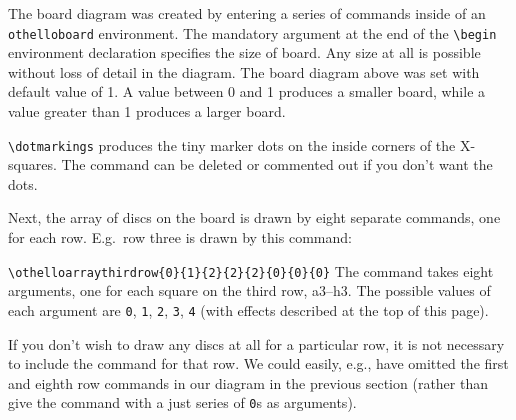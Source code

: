 \documentclass[a4paper,12pt]{article}
\begin{document}
The board diagram was created by entering a series of commands inside of an \verb=othelloboard= environment. The mandatory argument at the end of the \verb=\begin= environment declaration specifies the size of board. Any size at all is possible without loss of detail in the diagram. The board diagram above was set with default value of 1. A value between 0 and 1 produces a smaller board, while a value greater than 1 produces a larger board.

\begin{description}
\item{\verb=\dotmarkings=} produces the tiny marker dots on the inside corners of the X-squares. The command can be deleted or commented out if you don't want the dots.
\end{description}

Next, the array of discs on the board is drawn by eight separate commands, one for each row. E.g.\ row three is drawn by this command:
\begin{description}
\item{\verb=\othelloarraythirdrow{0}{1}{2}{2}{2}{0}{0}{0}=} The command takes eight arguments, one for each square on the third row, a3--h3. The possible values of each argument are \verb=0=, \verb=1=, \verb=2=, \verb=3=, \verb=4= (with effects described at the top of this page). 
\end{description}

If you don't wish to draw any discs at all for a particular row, it is not necessary to include the command for that row. We could easily, e.g., have omitted the first and eighth row commands in our diagram in the previous section (rather than give the command with a just series of \verb=0=s as arguments).
\end{document}
